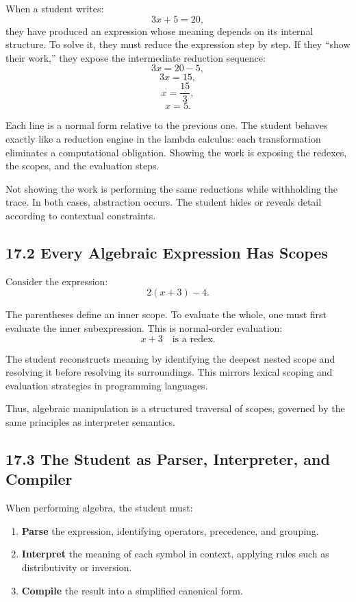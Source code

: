 \documentclass[12pt,letterpaper]{article}
\theoremstyle{remark}
\begin{document}
When a student writes:
\[
3x + 5 = 20,
\]
they have produced an expression whose meaning depends on its internal structure. To solve it, they must reduce the expression step by step. If they ``show their work,'' they expose the intermediate reduction sequence:
\[
3x = 20 - 5,
\]
\[
3x = 15,
\]
\[
x = \frac{15}{3},
\]
\[
x = 5.
\]

Each line is a normal form relative to the previous one. The student behaves exactly like a reduction engine in the lambda calculus: each transformation eliminates a computational obligation. Showing the work is exposing the redexes, the scopes, and the evaluation steps.

Not showing the work is performing the same reductions while withholding the trace. In both cases, abstraction occurs. The student hides or reveals detail according to contextual constraints.

\subsection{17.2 Every Algebraic Expression Has Scopes}

Consider the expression:
\[
2(x + 3) - 4.
\]

The parentheses define an inner scope. To evaluate the whole, one must first evaluate the inner subexpression. This is normal-order evaluation:
\[
x + 3 \quad \text{is a redex.}
\]

The student reconstructs meaning by identifying the deepest nested scope and resolving it before resolving its surroundings. This mirrors lexical scoping and evaluation strategies in programming languages.

Thus, algebraic manipulation is a structured traversal of scopes, governed by the same principles as interpreter semantics.

\subsection{17.3 The Student as Parser, Interpreter, and Compiler}

When performing algebra, the student must:

\begin{enumerate}
    \item \textbf{Parse} the expression, identifying operators, precedence, and grouping.
    \item \textbf{Interpret} the meaning of each symbol in context, applying rules such as distributivity or inversion.
    \item \textbf{Compile} the result into a simplified canonical form.
\end{enumerate}
\end{document}
